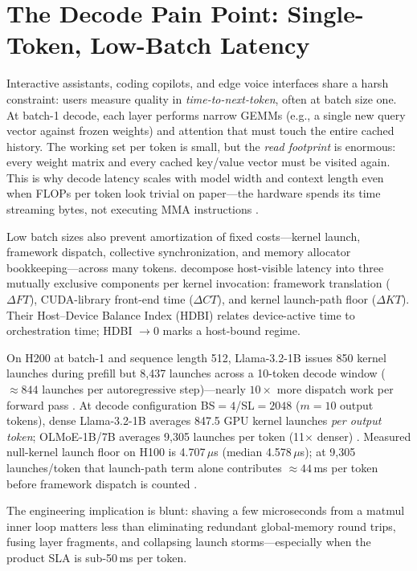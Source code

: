 \section{The Decode Pain Point: Single-Token, Low-Batch Latency}
\label{sec:decode_pain}

Interactive assistants, coding copilots, and edge voice interfaces share a harsh constraint: users measure quality in \emph{time-to-next-token}, often at batch size one.
At batch-1 decode, each layer performs narrow GEMMs (e.g., a single new query vector against frozen weights) and attention that must touch the entire cached history.
The working set per token is small, but the \emph{read footprint} is enormous: every weight matrix and every cached key/value vector must be visited again.
This is why decode latency scales with model width and context length even when FLOPs per token look trivial on paper---the hardware spends its time streaming bytes, not executing MMA instructions \citep{patel2025llminference,memoryfloor2026}.

Low batch sizes also prevent amortization of fixed costs---kernel launch, framework dispatch, collective synchronization, and memory allocator bookkeeping---across many tokens.
\citet{taxbreak2026} decompose host-visible latency into three mutually exclusive components per kernel invocation: framework translation ($\Delta FT$), CUDA-library front-end time ($\Delta CT$), and kernel launch-path floor ($\Delta KT$).
Their Host--Device Balance Index (HDBI) relates device-active time to orchestration time; HDBI $\to 0$ marks a host-bound regime.

On H200 at batch-1 and sequence length 512, Llama-3.2-1B issues 850 kernel launches during prefill but 8,437 launches across a 10-token decode window (${\approx}844$ launches per autoregressive step)---nearly $10\times$ more dispatch work per forward pass \citep{taxbreak2026}.
At decode configuration BS${=}4$/SL${=}2048$ ($m{=}10$ output tokens), dense Llama-3.2-1B averages 847.5 GPU kernel launches \emph{per output token}; OLMoE-1B/7B averages 9,305 launches per token (11$\times$ denser) \citep{taxbreak2026}.
Measured null-kernel launch floor on H100 is 4.707\,$\mu$s (median 4.578\,$\mu$s); at 9,305 launches/token that launch-path term alone contributes ${\approx}44$\,ms per token before framework dispatch is counted \citep{taxbreak2026}.

The engineering implication is blunt: shaving a few microseconds from a matmul inner loop matters less than eliminating redundant global-memory round trips, fusing layer fragments, and collapsing launch storms---especially when the product SLA is sub-50\,ms per token.

